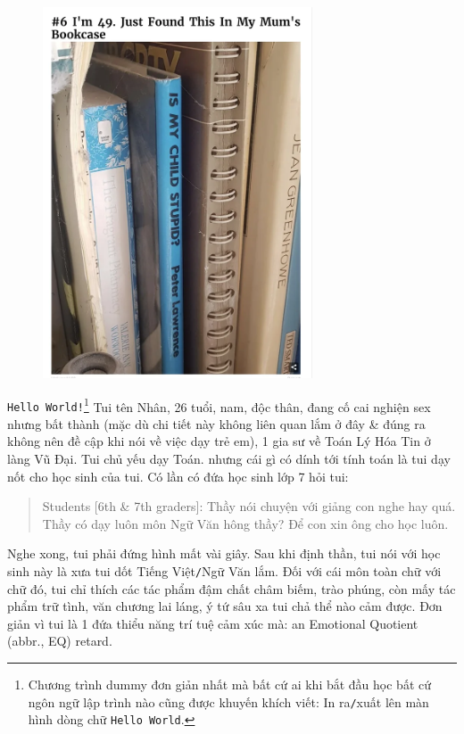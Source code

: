 \documentclass[12pt,oneside]{book}
\begin{document}
\begin{figure}[H]
	\centering
	\includegraphics[width = 8cm]{stupid_child}
\end{figure}
{\tt Hello World!}\footnote{Chương trình dummy đơn giản nhất mà bất cứ ai khi bắt đầu học bất cứ ngôn ngữ lập trình nào cũng được khuyến khích viết: In ra{\tt/}xuất lên màn hình dòng chữ {\tt Hello World}.} Tui tên {\sf Nhân}, 26 tuổi, nam, độc thân, đang cố cai nghiện sex nhưng bất thành (mặc dù chi tiết này không liên quan lắm ở đây \& đúng ra không nên đề cập khi nói về việc dạy trẻ em), 1 gia sư về Toán Lý Hóa Tin ở làng {\sf Vũ Đại}. Tui chủ yếu dạy Toán. nhưng cái gì có dính tới tính toán là tui dạy nốt cho học sinh của tui. Có lần có đứa học sinh lớp 7 hỏi tui:
\begin{quote}
	{\sf Students [6th \& 7th graders]}: Thầy nói chuyện với giảng con nghe hay quá. Thầy có dạy luôn môn Ngữ Văn hông thầy? Để con xin ông cho học luôn.
\end{quote}
Nghe xong, tui phải đứng hình mất vài giây. Sau khi định thần, tui nói với học sinh này là xưa tui dốt Tiếng Việt{\tt/}Ngữ Văn lắm. Đối với cái môn toàn chữ với chữ đó, tui chỉ thích các tác phẩm đậm chất châm biếm, trào phúng, còn mấy tác phẩm trữ tình, văn chương lai láng, ý tứ sâu xa tui chả thể nào cảm được. Đơn giản vì tui là 1 đứa thiểu năng trí tuệ cảm xúc mà: an Emotional Quotient (abbr., EQ) retard.
\end{document}
